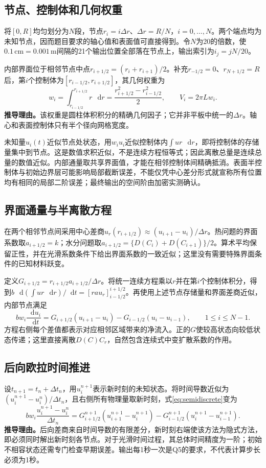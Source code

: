 \documentclass[UTF8,a4paper,zihao=-4,fontset=none]{ctexart}
\numberwithin{equation}{section}
\newcommand{\dd}{\mathop{}\!\mathrm d}
\newcommand{\units}[1]{\,\mathrm{#1}}
\newcommand{\reason}[1]{\textbf{推导理由。}#1\par}
\begin{document}
\subsection{节点、控制体和几何权重}
将$[0,R]$均匀划分为$N$段，节点$r_i=i\Delta r$、$\Delta r=R/N$，$i=0,\ldots,N$。两个端点均为未知节点，因而题目要求的轴心值和表面值可直接得到。令$N$为20的倍数，使$0.1\units{cm}=0.001\units m$间隔的21个输出位置全部落在节点上，输出索引为$i_j=jN/20$。

内部界面位于相邻节点中点$r_{i+1/2}=(r_i+r_{i+1})/2$。补充$r_{-1/2}=0$、$r_{N+1/2}=R$后，第$i$个控制体为$[r_{i-1/2},r_{i+1/2}]$，其几何权重为
\begin{equation}
w_i=\int_{r_{i-1/2}}^{r_{i+1/2}}r\,\dd r
=\frac{r_{i+1/2}^2-r_{i-1/2}^2}{2},
\qquad V_i=2\pi Lw_i.
\label{eq:weights}
\end{equation}
\reason{该权重是圆柱体积积分的精确几何因子；它并非平板中统一的$\Delta r$。轴心和表面控制体只有半个径向网格宽度。}

未知量$u_i(t)$近似节点处状态，用$w_i u_i$近似控制体内$\int u r\,\dd r$，即将控制体的存储量集中到节点。这是数值求积近似，不是连续方程恒等式；因此离散总量是连续总量的数值近似。内部通量取共享界面值，才能在相邻控制体间精确抵消。表面半控制体与初始边界层可能影响局部截断误差，不能仅凭中心差分形式就宣称所有位置均有相同的局部二阶误差；最终输出的空间阶由加密实测确认。

\subsection{界面通量与半离散方程}
在两个相邻节点间采用中心差商$u_r(r_{i+1/2})\approx(u_{i+1}-u_i)/\Delta r$。热问题的界面系数取$a_{i+1/2}=k$；水分问题取$a_{i+1/2}=\{D(C_i)+D(C_{i+1})\}/2$。算术平均保留正性，并在光滑系数条件下给出界面系数的一致近似；这里没有需要特殊界面条件的已知材料跃变。

定义$G_{i+1/2}=r_{i+1/2}a_{i+1/2}/\Delta r$。将统一连续方程乘以$r$并在第$i$个控制体积分，得到$b\,\dd(\int u r\,\dd r)/\dd t=[ra u_r]_{i-1/2}^{i+1/2}$。再使用上述节点存储量和界面差商近似，内部节点满足
\begin{equation}
bw_i\frac{\dd u_i}{\dd t}
=G_{i+1/2}(u_{i+1}-u_i)-G_{i-1/2}(u_i-u_{i-1}),
\qquad 1\le i\le N-1.
\label{eq:semidiscrete}
\end{equation}
方程右侧每个差值都表示对应相邻区域带来的净流入。正的$G$使较高状态向较低状态传递；这里直接离散$D(C)C_r$，自然包含连续式中变扩散系数的作用。

\subsection{后向欧拉时间推进}
设$t_{n+1}=t_n+\Delta t_n$，用$u_i^{n+1}$表示新时刻的未知状态。将时间导数近似为$(u_i^{n+1}-u_i^n)/\Delta t_n$，且右侧所有物理量取新时刻，式\eqref{eq:semidiscrete}变为
\begin{equation}
bw_i\frac{u_i^{n+1}-u_i^n}{\Delta t_n}
=G_{i+1/2}^{n+1}(u_{i+1}^{n+1}-u_i^{n+1})
-G_{i-1/2}^{n+1}(u_i^{n+1}-u_{i-1}^{n+1}).
\label{eq:be}
\end{equation}
\reason{后向差商来自时间导数的有限差分，新时刻右端使该方法为隐式方法，即必须同时解出新时刻各节点。对于光滑时间过程，其总体时间精度为一阶；初始不相容状态还需专门检查早期误差。输出每1秒一次是Q5的要求，不代表计算步长必须为1秒。}
\end{document}
